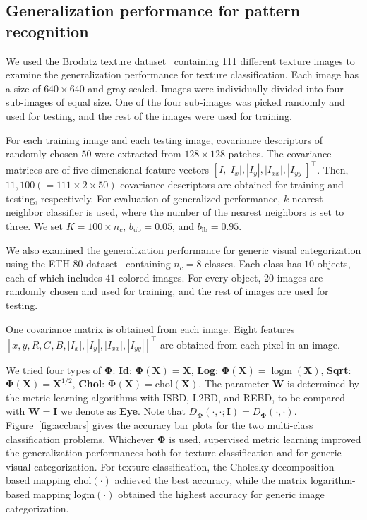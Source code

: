 \documentclass[10pt,onecolumn]{article}
\theoremstyle{definition}
\theoremstyle{definition}
\theoremstyle{definition}
\theoremstyle{definition}
\theoremstyle{definition}
\theoremstyle{theorem}
\newcommand{\0}{{\bm{0}}}
\newcommand{\1}{{\bm{1}}}
\newcommand{\vI}{{\bm{I}}}
\newcommand{\vW}{{\bm{W}}}
\newcommand{\X}{{\bm{X}}}
\newcommand{\vPhi}{{\bm{\Phi}}}
\DeclareMathOperator{\logm}{logm}
\begin{document}
\subsection{Generalization performance for pattern recognition}
%
We used the Brodatz texture dataset~\cite{randen1999filtering} containing 111
different texture images to examine the generalization
performance for texture classification. Each image has a size of
$640\times 640$ and gray-scaled. Images
were individually divided into four sub-images of equal size. One of
the four sub-images was picked randomly and used for
testing, and the rest of the images were used for training.

For each training image and each testing image, covariance
descriptors of randomly chosen $50$ were extracted from
$128\times 128$ patches. The covariance matrices are of
five-dimensional feature vectors
$\left[I,|I_{x}|,|I_{y}|,|I_{xx}|,|I_{yy}|\right]^\top$.
Then, $11,100(=111\times 2 \times 50)$ covariance
descriptors are obtained for training and testing,
respectively. For evaluation of generalized performance,
$k$-nearest neighbor classifier is used, where the number of
the nearest neighbors is set to three. We set $K=100\times
n_{c}$, $b_{\text{ub}}=0.05$, and $b_{\text{lb}}=0.95$.

We also examined the generalization performance for generic
visual categorization using the ETH-80 dataset~\cite{leibe2003analyzing} containing
$n_{c}=8$ classes. Each class has $10$ objects, each of which includes $41$
colored images. For every
object, $20$ images are randomly chosen and used for
training, and the rest of images are used for testing.

One covariance matrix is obtained from each image. Eight
features $\left[x, y, R, G, B,
|I_{x}|,|I_{y}|,|I_{xx}|,|I_{yy}|\right]^\top$ are obtained
from each pixel in an image.

We tried four types of $\vPhi$:
%
\textbf{Id}: $\vPhi(\X)=\X$,
\textbf{Log}: $\vPhi(\X)=\logm(\X)$,
\textbf{Sqrt}: $\vPhi(\X)=\X^{1/2}$,
\textbf{Chol}: $\vPhi(\X)=\text{chol}(\X)$. 
The parameter $\vW$ is determined
by the metric learning algorithms with
ISBD, L2BD, and REBD, to be compared with $\vW=\vI$ we denote as \textbf{Eye}. 
Note that $D_{\vPhi}(\cdot,\cdot;\vI)=D_{\vPhi}(\cdot,\cdot)$. 
Figure~\ref{fig:accbars} gives the accuracy bar plots for the two
multi-class classification problems. Whichever $\vPhi$ is
used, supervised metric learning improved the generalization
performances both for texture classification and for generic
visual categorization. For texture classification, the
Cholesky decomposition-based mapping $\text{chol}(\cdot)$
achieved the best accuracy, while the matrix logarithm-based mapping
$\text{logm}(\cdot)$ obtained the highest accuracy for generic image
categorization.
\end{document}
